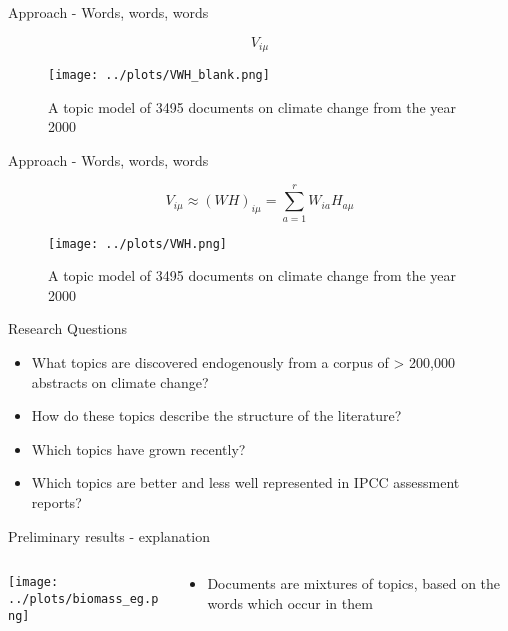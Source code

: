 \documentclass[9pt]{beamer}
\begin{document}
\begin{frame}{Approach - Words, words, words}

\begin{figure}
	
	\[V_{i\mu} \]
	
	\texttt{[image: ../plots/VWH\_blank.png]}
	
	\caption{A topic model of 3495 documents on climate change from the year 2000}
	
\end{figure}

\end{frame}


\begin{frame}{Approach - Words, words, words}

\begin{figure}
	
	\[V_{i\mu} \approx (WH)_{i\mu} = \sum_{a=1}^{r}W_{ia}H_{a\mu} \]
	
	\texttt{[image: ../plots/VWH.png]}
	
	\caption{A topic model of 3495 documents on climate change from the year 2000}
	
\end{figure}


\end{frame}

\begin{frame}{Research Questions}
\begin{itemize}
	\item What topics are discovered endogenously from a corpus of > 200,000 abstracts on climate change?
	\item How do these topics describe the structure of the literature?
	\item Which topics have grown recently?
	\item Which topics are better and less well represented in IPCC assessment reports?
\end{itemize}
\end{frame}


\begin{frame}{Preliminary results - explanation}

\begin{columns}
	\begin{column}{0.5\linewidth}
		\begin{center}
			\texttt{[image: ../plots/biomass\_eg.png]}
		\end{center}
	\end{column}
	\begin{column}{0.5\linewidth}
		\begin{center}
			\begin{itemize}
				\item Documents are mixtures of topics, based on the words which occur in them
			\end{itemize}
		\end{center}
	\end{column}
\end{columns}

\end{frame}
\end{document}
